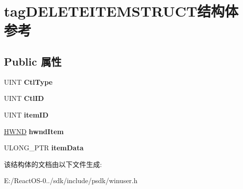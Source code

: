 \hypertarget{structtag_d_e_l_e_t_e_i_t_e_m_s_t_r_u_c_t}{}\section{tag\+D\+E\+L\+E\+T\+E\+I\+T\+E\+M\+S\+T\+R\+U\+C\+T结构体 参考}
\label{structtag_d_e_l_e_t_e_i_t_e_m_s_t_r_u_c_t}
\subsection*{Public 属性}
\begin{DoxyCompactItemize}
\item 
\mbox{\label{structtag_d_e_l_e_t_e_i_t_e_m_s_t_r_u_c_t_a71e2ca4f683fd14addc17fc872dd4d9c}} 
U\+I\+NT {\bfseries Ctl\+Type}
\item 
\mbox{\label{structtag_d_e_l_e_t_e_i_t_e_m_s_t_r_u_c_t_a34d4dda95537539fc50c7c781ae52aac}} 
U\+I\+NT {\bfseries Ctl\+ID}
\item 
\mbox{\label{structtag_d_e_l_e_t_e_i_t_e_m_s_t_r_u_c_t_a0afedd14841db1862677c8ae37cee3cc}} 
U\+I\+NT {\bfseries item\+ID}
\item 
\mbox{\label{structtag_d_e_l_e_t_e_i_t_e_m_s_t_r_u_c_t_aac5b50cd6c66164c64cdf4a056e1ea3d}} 
\hyperlink{interfacevoid}{H\+W\+ND} {\bfseries hwnd\+Item}
\item 
\mbox{\label{structtag_d_e_l_e_t_e_i_t_e_m_s_t_r_u_c_t_aa7c8b8e71a314aebac0df9970210ce40}} 
U\+L\+O\+N\+G\+\_\+\+P\+TR {\bfseries item\+Data}
\end{DoxyCompactItemize}


该结构体的文档由以下文件生成\+:\begin{DoxyCompactItemize}
\item 
E\+:/\+React\+O\+S-\/0../sdk/include/psdk/winuser.\+h\end{DoxyCompactItemize}
